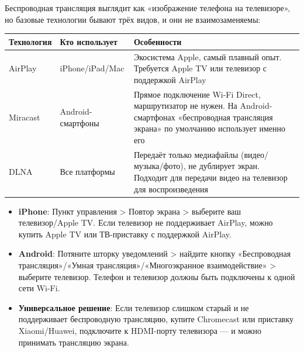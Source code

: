 


Беспроводная трансляция выглядит как «изображение телефона на телевизоре», но базовые технологии бывают трёх видов, и они не взаимозаменяемы:

\begin{center}
\begin{tabularx}{\linewidth}{|X|X|X|}
\hline
\textbf{Технология} & \textbf{Кто использует} & \textbf{Особенности} \tabularnewline
\hline
AirPlay & iPhone/iPad/Mac & Экосистема Apple, самый плавный опыт. Требуется Apple TV или телевизор с поддержкой AirPlay \tabularnewline
Miracast & Android-смартфоны & Прямое подключение Wi-Fi Direct, маршрутизатор не нужен. На Android-смартфонах «беспроводная трансляция экрана» по умолчанию использует именно его \tabularnewline
DLNA & Все платформы & Передаёт только медиафайлы (видео/музыка/фото), не дублирует экран. Подходит для передачи видео на телевизор для воспроизведения \tabularnewline
\hline
\end{tabularx}
\end{center}


\begin{itemize}
  \item \textbf{iPhone}: Пункт управления > Повтор экрана > выберите ваш телевизор/Apple TV. Если телевизор не поддерживает AirPlay, можно купить Apple TV или ТВ-приставку с поддержкой AirPlay.
  \item \textbf{Android}: Потяните шторку уведомлений > найдите кнопку «Беспроводная трансляция»/«Умная трансляция»/«Многоэкранное взаимодействие» > выберите телевизор. Телефон и телевизор должны быть подключены к одной сети Wi-Fi.
  \item \textbf{Универсальное решение}: Если телевизор слишком старый и не поддерживает беспроводную трансляцию, купите Chromecast или приставку Xiaomi/Huawei, подключите к HDMI-порту телевизора — и можно принимать трансляцию экрана.
\end{itemize}

